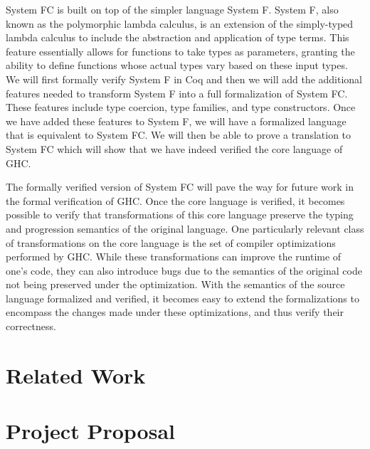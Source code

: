 \documentclass{sig-alternate}
\begin{document}
System FC is built on top of the simpler language System F.  System F, also known as the polymorphic lambda calculus, is an extension of the simply-typed lambda calculus to include the abstraction and application of type terms. This feature essentially allows for functions to take types as parameters, granting the ability to define functions whose actual types vary based on these input types. We will first formally verify System F in Coq and then we will add the additional features needed to transform System F into a full formalization of System FC.  These features include type coercion, type families, and type constructors.  Once we have added these features to System F, we will have a formalized language that is equivalent to System FC.  We will then be able to prove a translation to System FC which will show that we have indeed verified the core language of GHC.

The formally verified version of System FC will pave the way for future work in the formal verification of GHC. Once the core language is verified, it becomes possible to verify that transformations of this core language preserve the typing and progression semantics of the original language.  One particularly relevant class of transformations on the core language is the set of compiler optimizations performed by GHC. While these transformations can improve the runtime of one’s code, they can also introduce bugs due to the semantics of the original code not being preserved under the optimization. With the semantics of the source language formalized and verified, it becomes easy to extend the formalizations to encompass the changes made under these optimizations, and thus verify their correctness. 

\section{Related Work}
\label{sec:related_work}


\section{Project Proposal}
\label{sec:project_proposal}
\end{document}
